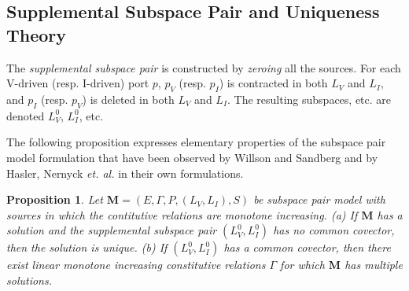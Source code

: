 \documentclass{amsproc-sunycstr}
\theoremstyle{plain}
\newtheorem{proposition}{Proposition}
\theoremstyle{definition}
\theoremstyle{remark}
\begin{document}
\subsection{Supplemental Subspace Pair and Uniqueness Theory}


\begin{comment}
Familiar topological conditions on dependencies among source values
pertain to the \textit{matroids} of the subspaces $L_V$ and $L_I$.
Questions about existence and uniqueness of solution
will be answered in terms of supplementary subspace pair models
which are obtained by the familiar operations of opening and shorting ports.
Finally, operations on subspace pairs that model nullor insertion are
defined, so that such ideal elements can be modeled combinatorially or
geometrically.  

The supplemental subspace pair derived after nullor 
insertion will typically not be orthogonal.  One might also choose to
model linearized CCCSs or VCVSs within one of the subspaces.  
\end{comment}


The \textit{supplemental subspace pair}
is constructed by \textit{zeroing} all the sources.
For each V-driven (resp. I-driven) port $p$, $p_V$ 
(resp. $p_I$) is 
contracted in both $L_V$ and $L_I$, and $p_I$ 
(resp. $p_V$) is deleted in
both $L_V$ and $L_I$.
The resulting subspaces, etc.  are denoted $L_V^0$, $L_I^0$, etc.


The following proposition expresses elementary properties of the 
subspace pair model formulation that have been observed by
Willson and Sandberg \cite{} and by Hasler, Nernyck \textit{et. al.}
\cite{} in their own formulations.

\begin{proposition}
\label{Uniquenessprop}
Let $\mathbf{M}=(E, \Gamma, P, (L_V, L_I), S)$ be subspace pair model
with sources in which the contitutive relations are monotone
increasing.  (a) If $\mathbf{M}$ has a solution and the supplemental
subspace pair $(L_V^0,L_I^0)$ has no common covector, then the solution
is unique. (b) If $(L_V^0,L_I^0)$ has a common covector, then there exist
linear monotone increasing constitutive relations $\Gamma$ for which
$\mathbf{M}$ has multiple solutions.
\end{proposition}
\end{document}
